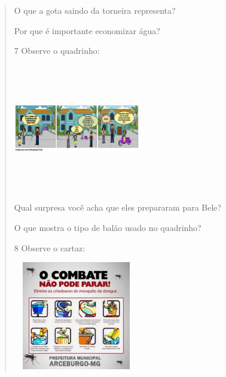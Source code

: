 \begin{verse}

\begin{escolha}
\item O que a gota saindo da torneira representa?


\item Por que é importante economizar água?

\end{escolha}

\num{7} Observe o quadrinho:

\includegraphics[width=2.17917in,height=2.18750in]{media/image129.png}

\begin{escolha}
\item Qual surpresa você acha que eles prepararam para Bele?


\item O que mostra o tipo de balão usado no quadrinho?

\end{escolha}

\num{8} Observe o cartaz:

\includegraphics[width=2.15306in,height=1.86730in]{media/image134.jpeg}


\end{verse}

